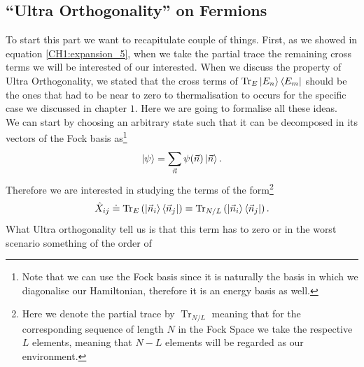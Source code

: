 \subsection{``Ultra Orthogonality'' on Fermions}
To start this part we want to recapitulate couple of things. First, as we showed in equation \eqref{CH1:expansion_5}, when we take the partial trace the remaining cross terms we will be interested of our interested. When we discuss the property of Ultra Orthogonality, we stated that the cross terms of $\operatorname{Tr}_{E}\mathinner{|{E_n}\rangle}\mathinner{\langle{E_m}|}$ should be the ones that had to be near to zero to thermalisation to occurs for the specific case we discussed in chapter $1$. Here we are going to formalise all these ideas.\\
We can start by choosing an arbitrary state such that it can be decomposed in its vectors of the Fock basis as\footnote{Note that we can use the Fock basis since it is naturally the basis in which we diagonalise our Hamiltonian, therefore it is an energy basis as well.}
\begin{equation}
\mathinner{|{\psi}\rangle} = \sum_{\vec{n}}\psi(\vec{n})\mathinner{|{\vec{n}}\rangle}.
\end{equation}
Therefore we are interested in studying the terms of the form\footnote{Here we denote the partial trace by $\operatorname{Tr}_{N/L}$ meaning that for the corresponding sequence of length $N$ in the Fock Space we take the respective $L$ elements, meaning that $N-L$ elements will be regarded as our environment.}
\begin{equation}
\hat{X}_{ij} \doteq \operatorname{Tr}_{E}\left(\mathinner{|{\vec{n}_i}\rangle}\mathinner{\langle{\vec{n}_j}|}\right) \equiv \operatorname{Tr}_{N/L}\left(\mathinner{|{\vec{n}_i}\rangle}\mathinner{\langle{\vec{n}_j}|}\right).
\end{equation}
What Ultra orthogonality tell us is that this term has to zero or in the worst scenario something of the order of 
